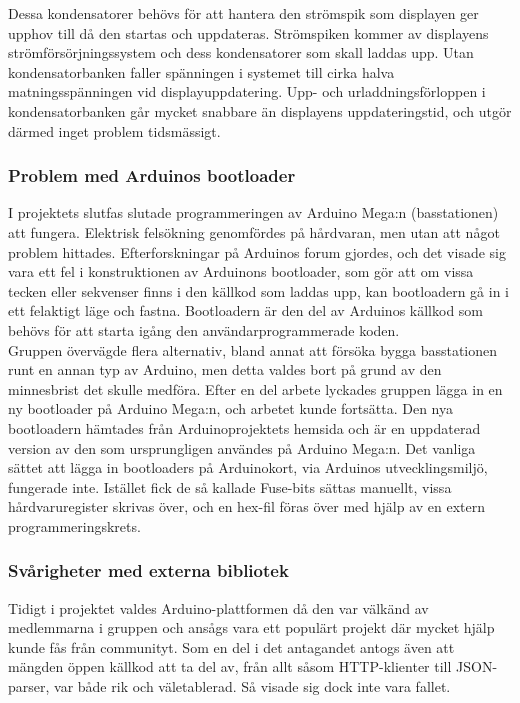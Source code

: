 \documentclass[a4paper,11pt]{article}
\begin{document}
Dessa kondensatorer behövs för att hantera den strömspik som displayen ger upphov till då den startas och uppdateras. Strömspiken kommer av displayens strömförsörjningssystem och dess kondensatorer som skall laddas upp. Utan kondensatorbanken faller spänningen i systemet till cirka halva matningsspänningen vid displayuppdatering. Upp- och urladdningsförloppen i kondensatorbanken går mycket snabbare än displayens uppdateringstid, och utgör därmed inget problem tidsmässigt.

\subsubsection{Problem med Arduinos bootloader}
I projektets slutfas slutade programmeringen av Arduino Mega:n (basstationen) att fungera. Elektrisk felsökning genomfördes på hårdvaran, men utan att något problem hittades. Efterforskningar på Arduinos forum gjordes, och det visade sig vara ett fel i konstruktionen av Arduinons bootloader, som gör att om vissa tecken eller sekvenser finns i den källkod som laddas upp, kan bootloadern gå in i ett felaktigt läge och fastna. Bootloadern är den del av Arduinos källkod som behövs för att starta igång den användarprogrammerade koden. \\

Gruppen övervägde flera alternativ, bland annat att försöka bygga basstationen runt en annan typ av Arduino, men detta valdes bort på grund av den minnesbrist det skulle medföra. Efter en del arbete lyckades gruppen lägga in en ny bootloader på Arduino Mega:n, och arbetet kunde fortsätta. Den nya bootloadern hämtades från Arduinoprojektets hemsida och är en uppdaterad version av den som ursprungligen användes på Arduino Mega:n. Det vanliga sättet att lägga in bootloaders på Arduinokort, via Arduinos utvecklingsmiljö, fungerade inte. Istället fick de så kallade Fuse-bits sättas manuellt, vissa hårdvaruregister skrivas över, och en hex-fil föras över med hjälp av en extern programmeringskrets.

\subsubsection{Svårigheter med externa bibliotek}
Tidigt i projektet valdes Arduino-plattformen då den var välkänd av medlemmarna i gruppen och ansågs vara ett populärt projekt där mycket hjälp kunde fås från communityt. Som en del i det antagandet antogs även att mängden öppen källkod att ta del av, från allt såsom HTTP-klienter till JSON-parser, var både rik och väletablerad. Så visade sig dock inte vara fallet.\\
\end{document}
